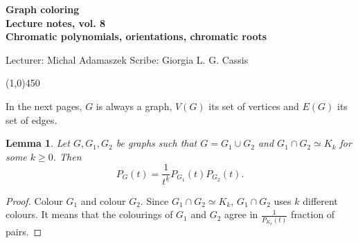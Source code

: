 \documentclass[a4paper]{article}
\theoremstyle{plain}
\newtheorem{lemma}{Lemma}
\theoremstyle{myremark}
\begin{document}
\thispagestyle{empty}

\begin{center}
	{\Large\bf Graph coloring}\\
	{\bf Lecture notes, vol. 8 \\ Chromatic polynomials, orientations, chromatic roots}\\
\end{center}
Lecturer: Michal Adamaszek \hfill Scribe: Giorgia L. G. Cassis
\begin{center}
\line(1,0){450}
\end{center}


In the next pages, $G$ is always a graph, $V(G)$ its set of vertices and $E(G)$ its set of edges. 

\begin{lemma} Let $G,G_1,G_2$ be graphs such that $G=G_1 \cup G_2$ and $G_1 \cap G_2 \simeq K_k$ for some $k\geqslant 0$. Then
$$P_G(t)=\frac{1}{t^{\underline{k}}}P_{G_1}(t)P_{G_2}(t).$$
\begin{figure}[H]
\begin{center}
\end{center}
\end{figure}
\end{lemma}

\begin{proof}
Colour $G_1$ and colour $G_2$. Since $G_1 \cap G_2 \simeq K_k$, $G_1 \cap G_2$ uses $k$ different colours. It means that the colourings of $G_1$ and $G_2$ agree in $\frac{1}{P_{K_k}(t)}$ fraction of pairs.
\end{proof}
\end{document}
